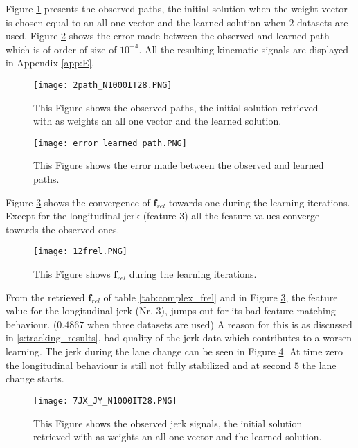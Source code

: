 Figure \ref{fig:complex_path} presents the observed paths, the initial solution when the weight vector is chosen equal to an all-one vector and the learned solution when $2$ datasets are used. Figure \ref{fig:complex_path_error} shows the error made between the observed and learned path which is of order of size of $10^{-4}$. All the resulting kinematic signals are displayed in Appendix \ref{app:E}.

\begin{figure}[h!]
	\centering
	\texttt{[image: 2path\_N1000IT28.PNG]}
	\caption{This Figure shows the observed paths, the initial solution retrieved with as weights an all one vector and the learned solution.}	
	\label{fig:complex_path}
\end{figure}

\begin{figure}[h!]
	\centering
	\texttt{[image: error learned path.PNG]}
	\caption{This Figure shows the error made between the observed and learned paths.}	
	\label{fig:complex_path_error}
\end{figure}

Figure \ref{fig:complex_convergence} shows the convergence of $\bm{f}_{rel}$ towards one during the learning iterations. Except for the longitudinal jerk (feature $3$) all the feature values converge towards the observed ones.

\begin{figure}[h!]
	\centering
	\texttt{[image: 12frel.PNG]}
	\caption{This Figure shows $\bm{f}_{rel}$ during the learning iterations.}	
	\label{fig:complex_convergence}
\end{figure}

From the retrieved $\bm{f}_{rel}$ of table \ref{tab:complex_frel} and in Figure \ref{fig:complex_convergence}, the feature value for the longitudinal jerk (Nr. $3$), jumps out for its bad feature matching behaviour. ($0.4867$ when three datasets are used) A reason for this is as discussed in \ref{s:tracking_results}, bad quality of the jerk data which contributes to a worsen learning. The jerk during the lane change can be seen in Figure \ref{fig:complex_jerk}. At time zero the longitudinal behaviour is still not fully stabilized and at second $5$ the lane change starts.

\begin{figure}[h!]
	\centering
	\texttt{[image: 7JX\_JY\_N1000IT28.PNG]}
	\caption{This Figure shows the observed jerk signals, the initial solution retrieved with as weights an all one vector and the learned solution.}	
	\label{fig:complex_jerk}
\end{figure}
 \newpage                                
